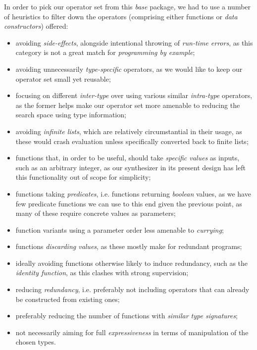 \documentclass{article}
\begin{document}
In order to pick our operator set from this \emph{base} package,
we had to use a number of heuristics to filter down the operators (comprising either functions or \emph{data constructors}) offered:
\begin{itemize}
    \item avoiding \emph{side-effects}, alongside intentional throwing of \emph{run-time errors}, as this category is not a great match for \emph{programming by example};
    \item avoiding unnecessarily \emph{type-specific} operators, as we would like to keep our operator set small yet reusable;
    \item focusing on different \emph{inter-type} over using various similar \emph{intra-type} operators, as the former helps make our operator set more amenable to reducing the search space using type information;
    \item avoiding \emph{infinite lists}, which are relatively circumstantial in their usage, as these would crash evaluation unless specifically converted back to finite lists;
    \item functions that, in order to be useful, should take \emph{specific values} as inputs, such as an arbitrary integer, as our synthesizer in its present design has left this functionality out of scope for simplicity;
    \item functions taking \emph{predicates}, i.e. functions returning \emph{boolean} values, as we have few predicate functions we can use to this end given the previous point, as many of these require concrete values as parameters;
    \item function variants using a parameter order less amenable to \emph{currying};
    \item functions \emph{discarding values}, as these mostly make for redundant programs;
    \item ideally avoiding functions otherwise likely to induce redundancy, such as the \emph{identity function}, as this clashes with strong supervision;
    \item reducing \emph{redundancy}, i.e. preferably not including operators that can already be constructed from existing ones;
    \item preferably reducing the number of functions with \emph{similar type signatures};
    \item not necessarily aiming for full \emph{expressiveness} in terms of manipulation of the chosen types.
\end{itemize}
\end{document}
